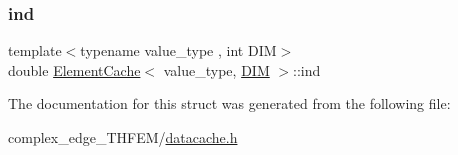 \subsubsection{\texorpdfstring{ind}{ind}}
{\footnotesize\ttfamily template$<$typename value\+\_\+type , int D\+IM$>$ \\
double \mbox{\hyperlink{struct_element_cache}{Element\+Cache}}$<$ value\+\_\+type, \mbox{\hyperlink{complex__node___t_h_f_e_m_2uiexp_8h_a589b8b9bfdf714f736059845d568b597}{D\+IM}} $>$\+::ind}



The documentation for this struct was generated from the following file\+:\begin{DoxyCompactItemize}
\item 
complex\+\_\+edge\+\_\+\+T\+H\+F\+E\+M/\mbox{\hyperlink{complex__edge___t_h_f_e_m_2datacache_8h}{datacache.\+h}}\end{DoxyCompactItemize}
